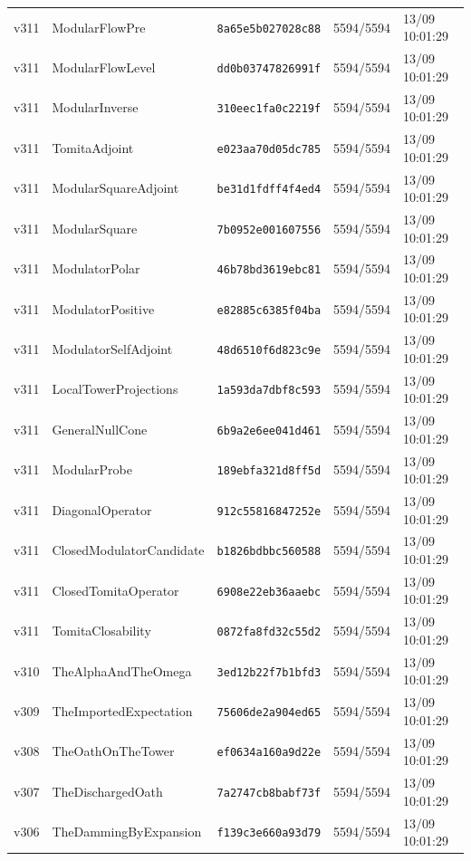 \documentclass[11pt]{article}
\theoremstyle{definition}\newtheorem{deriv}{Derivation}
\begin{document}
{\begin{longtable}{@{}lllll@{}}
v311 & ModularFlowPre & \texttt{8a65e5b027028c88} & 5594/5594 & 13/09 10:01:29 \\
v311 & ModularFlowLevel & \texttt{dd0b03747826991f} & 5594/5594 & 13/09 10:01:29 \\
v311 & ModularInverse & \texttt{310eec1fa0c2219f} & 5594/5594 & 13/09 10:01:29 \\
v311 & TomitaAdjoint & \texttt{e023aa70d05dc785} & 5594/5594 & 13/09 10:01:29 \\
v311 & ModularSquareAdjoint & \texttt{be31d1fdff4f4ed4} & 5594/5594 & 13/09 10:01:29 \\
v311 & ModularSquare & \texttt{7b0952e001607556} & 5594/5594 & 13/09 10:01:29 \\
v311 & ModulatorPolar & \texttt{46b78bd3619ebc81} & 5594/5594 & 13/09 10:01:29 \\
v311 & ModulatorPositive & \texttt{e82885c6385f04ba} & 5594/5594 & 13/09 10:01:29 \\
v311 & ModulatorSelfAdjoint & \texttt{48d6510f6d823c9e} & 5594/5594 & 13/09 10:01:29 \\
v311 & LocalTowerProjections & \texttt{1a593da7dbf8c593} & 5594/5594 & 13/09 10:01:29 \\
v311 & GeneralNullCone & \texttt{6b9a2e6ee041d461} & 5594/5594 & 13/09 10:01:29 \\
v311 & ModularProbe & \texttt{189ebfa321d8ff5d} & 5594/5594 & 13/09 10:01:29 \\
v311 & DiagonalOperator & \texttt{912c55816847252e} & 5594/5594 & 13/09 10:01:29 \\
v311 & ClosedModulatorCandidate & \texttt{b1826bdbbc560588} & 5594/5594 & 13/09 10:01:29 \\
v311 & ClosedTomitaOperator & \texttt{6908e22eb36aaebc} & 5594/5594 & 13/09 10:01:29 \\
v311 & TomitaClosability & \texttt{0872fa8fd32c55d2} & 5594/5594 & 13/09 10:01:29 \\
v310 & TheAlphaAndTheOmega & \texttt{3ed12b22f7b1bfd3} & 5594/5594 & 13/09 10:01:29 \\
v309 & TheImportedExpectation & \texttt{75606de2a904ed65} & 5594/5594 & 13/09 10:01:29 \\
v308 & TheOathOnTheTower & \texttt{ef0634a160a9d22e} & 5594/5594 & 13/09 10:01:29 \\
v307 & TheDischargedOath & \texttt{7a2747cb8babf73f} & 5594/5594 & 13/09 10:01:29 \\
v306 & TheDammingByExpansion & \texttt{f139c3e660a93d79} & 5594/5594 & 13/09 10:01:29 \\

\end{longtable}}
\end{document}
